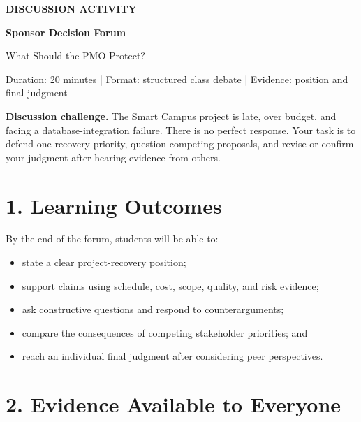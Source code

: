 \documentclass[11pt,a4paper]{article}
\begin{document}
\begin{center}
  {\small\bfseries\color{pmoPink} DISCUSSION ACTIVITY}\par
  \vspace{2mm}
  {\Huge\bfseries\color{pmoDark} Sponsor Decision Forum}\par
  \vspace{2mm}
  {\Large What Should the PMO Protect?}\par
  \vspace{3mm}
  {\small Duration: 20 minutes \quad | \quad Format: structured class debate \quad | \quad Evidence: position and final judgment}
\end{center}

\begin{forumbox}
\textbf{Discussion challenge.} The Smart Campus project is late, over budget, and facing a database-integration failure. There is no perfect response. Your task is to defend one recovery priority, question competing proposals, and revise or confirm your judgment after hearing evidence from others.
\end{forumbox}

\section{1. Learning Outcomes}

By the end of the forum, students will be able to:

\begin{itemize}
  \item state a clear project-recovery position;
  \item support claims using schedule, cost, scope, quality, and risk evidence;
  \item ask constructive questions and respond to counterarguments;
  \item compare the consequences of competing stakeholder priorities; and
  \item reach an individual final judgment after considering peer perspectives.
\end{itemize}

\section{2. Evidence Available to Everyone}
\end{document}
